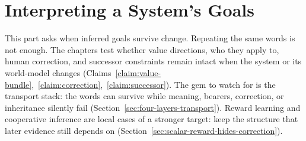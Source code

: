 \part{Interpreting a System's Goals}

This part asks when inferred goals survive change.
Repeating the same words is not enough.
The chapters test whether value directions, who they apply to, human correction, and successor constraints remain intact when the system or its world-model changes (Claims~\ref{claim:value-bundle},~\ref{claim:correction},~\ref{claim:successor}).
The gem to watch for is the transport stack: the words can survive while meaning, bearers, correction, or inheritance silently fail (Section~\ref{sec:four-layers-transport}).
Reward learning and cooperative inference are local cases of a stronger target: keep the structure that later evidence still depends on (Section~\ref{sec:scalar-reward-hides-correction}).





